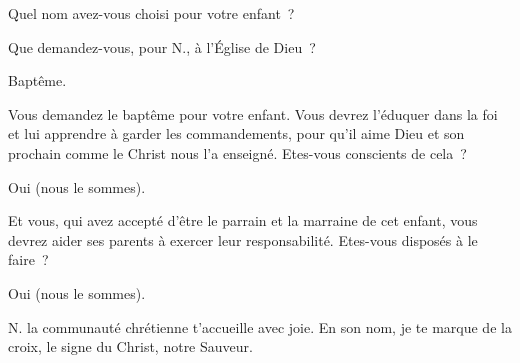 
Quel nom avez-vous choisi pour votre enfant~?


 Que demandez-vous, pour {\color{red}N.}, à l'Église de Dieu~?

 Baptême.

 Vous demandez le baptême pour votre enfant.
Vous devrez l’éduquer dans la foi et lui apprendre à garder les
commandements, pour qu’il aime Dieu et son prochain comme le Christ
nous l’a enseigné. Etes-vous conscients de cela~?

 Oui (nous le sommes).

Et vous, qui avez accepté d’être le parrain et la marraine de cet enfant,
vous devrez aider ses parents à exercer leur responsabilité. Etes-vous
disposés à le faire~?

 Oui (nous le sommes).

 {\color{red}N.} la communauté chrétienne t’accueille
avec joie. En son nom, je te marque de la croix, le signe du Christ,
notre Sauveur.

